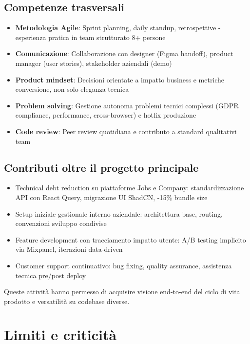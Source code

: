 \subsection{Competenze trasversali}
\begin{itemize}
  \item \textbf{Metodologia Agile}: Sprint planning, daily standup, 
        retrospettive - esperienza pratica in team strutturato 8+ persone
  \item \textbf{Comunicazione}: Collaborazione con designer (Figma 
        handoff), product manager (user stories), stakeholder aziendali 
        (demo)
  \item \textbf{Product mindset}: Decisioni orientate a impatto business 
        e metriche conversione, non solo eleganza tecnica
  \item \textbf{Problem solving}: Gestione autonoma problemi tecnici 
        complessi (GDPR compliance, performance, cross-browser) e 
        hotfix produzione
  \item \textbf{Code review}: Peer review quotidiana e contributo a 
        standard qualitativi team
\end{itemize}

\subsection{Contributi oltre il progetto principale}
\begin{itemize}
  \item Technical debt reduction su piattaforme Jobs e Company: 
        standardizzazione API con React Query, migrazione UI ShadCN, 
        -15\% bundle size
  \item Setup iniziale gestionale interno aziendale: architettura base, 
        routing, convenzioni sviluppo condivise
  \item Feature development con tracciamento impatto utente: A/B 
        testing implicito via Mixpanel, iterazioni data-driven
  \item Customer support continuativo: bug fixing, quality assurance, 
        assistenza tecnica pre/post deploy
\end{itemize}

Queste attività hanno permesso di acquisire visione end-to-end del 
ciclo di vita prodotto e versatilità su codebase diverse.

\section{Limiti e criticità}
